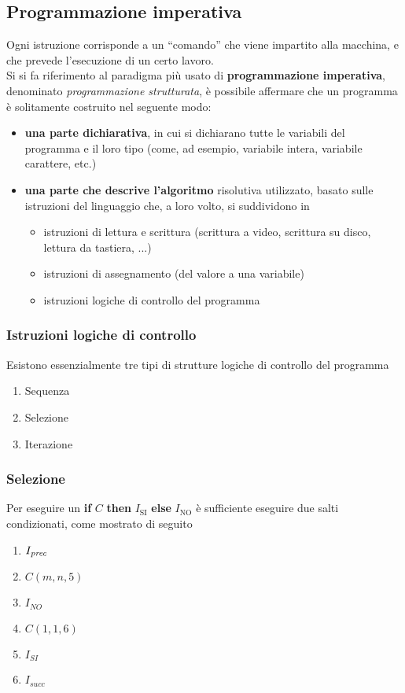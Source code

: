 \documentclass[a4paper]{extarticle}
\newcommand{\quotes}[1]{``#1''}
\begin{document}
\vspace{1em}
\subsection{Programmazione imperativa}
Ogni istruzione corrisponde a un \quotes{comando} che viene impartito alla macchina, e che prevede l'esecuzione di un certo lavoro.\\
Si si fa riferimento al paradigma più usato di \textbf{programmazione imperativa}, denominato \textit{programmazione strutturata}, è possibile affermare che un programma è solitamente costruito nel seguente modo:
\begin{itemize}
    \item \textbf{una parte dichiarativa}, in cui si dichiarano tutte le variabili del programma e il loro tipo (come, ad esempio, variabile intera, variabile carattere, etc.)
    \item \textbf{una parte che descrive l'algoritmo} risolutiva utilizzato, basato sulle istruzioni del linguaggio che, a loro volto, si suddividono in
    \begin{itemize}
        \item istruzioni di lettura e scrittura (scrittura a video, scrittura su disco, lettura da tastiera, ...)
        \item istruzioni di assegnamento (del valore a una variabile)
        \item istruzioni logiche di controllo del programma
    \end{itemize}
\end{itemize}

\vspace{1em}
\noindent
\subsubsection{Istruzioni logiche di controllo}
Esistono essenzialmente tre tipi di strutture logiche di controllo del programma
\begin{enumerate}
    \item Sequenza
    \item Selezione
    \item Iterazione
\end{enumerate}

\vspace{1em}
\subsubsection{Selezione}
Per eseguire un \textbf{if} \(C\) \textbf{then} \(I_{\text{SI}}\) \textbf{else} \(I_{\text{NO}}\) è sufficiente eseguire due salti condizionati, come mostrato di seguito
\begin{enumerate}
    \item \(I_\text{\textit{prec}}\)
    \item \(C(m, n, 5)\)
    \item \(I_{\textit{NO}}\)
    \item \(C(1, 1, 6)\)
    \item \(I_{\textit{SI}}\)
    \item \(I_{\textit{succ}}\)
\end{enumerate}
\end{document}
